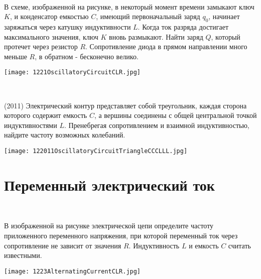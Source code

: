 \begin{ex}
\hspace{0pt} \\
\begin{minipage}{.65\textwidth}
В схеме, изображенной на рисунке, в некоторый момент времени замыкают ключ $K$, и конденсатор емкостью $C$, имеющий первоначальный заряд $q_0$, начинает заряжаться через катушку индуктивности $L$. 
Когда ток разряда достигает максимального значения, ключ $K$ вновь размыкают. Найти заряд $Q$, который протечет через резистор $R$. 
Сопротивление диода в прямом направлении много меньше $R$, в обратном - бесконечно велико.
\end{minipage}
\begin{minipage}{.35\textwidth}
\centering
\texttt{[image: 1221OscillatoryCircuitCLR.jpg]}
\end{minipage}
\begin{ans}
\end{ans}
\end{ex}

\begin{ex}
\hspace{0pt} \\
\begin{minipage}{.65\textwidth}
(2011) Электрический контур представляет собой треугольник, каждая сторона которого содержит емкость $C$, а вершины соединены с общей центральной точкой индуктивностями $L$. 
Пренебрегая сопротивлением и взаимной индуктивностью, найдите частоту возможных колебаний.
\end{minipage}
\begin{minipage}{.35\textwidth}
\centering
\texttt{[image: 122011OscillatoryCircuitTriangleCCCLLL.jpg]}
\end{minipage}
\begin{ans}
\end{ans}
\end{ex}

\section{Переменный электрический ток}

\begin{ex}
\hspace{0pt} \\
\begin{minipage}{.65\textwidth}
В изображенной на рисунке электрической цепи определите частоту приложенного переменного напряжения, при которой переменный ток через сопротивление не зависит от значения $R$. Индуктивность $L$ и емкость $C$ считать известными.
\end{minipage}
\begin{minipage}{.35\textwidth}
\centering
\texttt{[image: 1223AlternatingCurrentCLR.jpg]}
\end{minipage}
\begin{ans}
\end{ans}
\end{ex}

